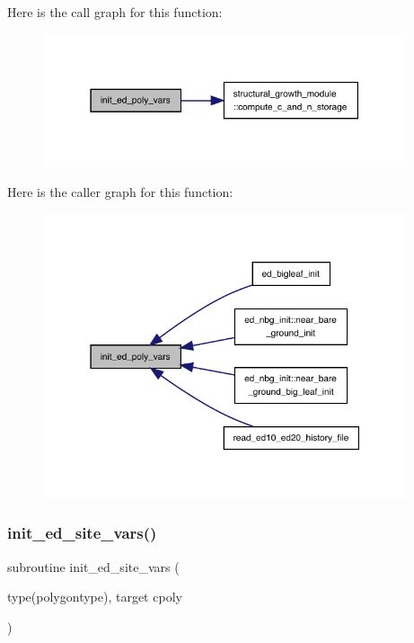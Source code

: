 Here is the call graph for this function\+:
\nopagebreak
\begin{figure}[H]
\begin{center}
\leavevmode
\includegraphics[width=303pt]{ed__type__init_8f90_a67afe21be4346c13ced583c229e2bb4c_cgraph}
\end{center}
\end{figure}
Here is the caller graph for this function\+:
\nopagebreak
\begin{figure}[H]
\begin{center}
\leavevmode
\includegraphics[width=304pt]{ed__type__init_8f90_a67afe21be4346c13ced583c229e2bb4c_icgraph}
\end{center}
\end{figure}
\mbox{\label{ed__type__init_8f90_a927351bf6adb1dbeb9ab1f434ef9e5b6}} 
\subsubsection{\texorpdfstring{init\+\_\+ed\+\_\+site\+\_\+vars()}{init\_ed\_site\_vars()}}
{\footnotesize\ttfamily subroutine init\+\_\+ed\+\_\+site\+\_\+vars (\begin{DoxyParamCaption}\item[{type(polygontype), target}]{cpoly }\end{DoxyParamCaption})}

